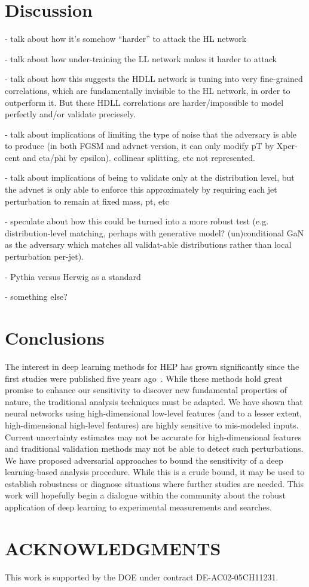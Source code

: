 \documentclass[reprint,nofootinbib,...]{revtex4-1}
\begin{document}
\section{Discussion}
\label{sec:discussion}



- talk about how it's somehow ``harder'' to attack the HL network

- talk about how under-training the LL network makes it harder to attack

- talk about how this suggests the HDLL network is tuning into very fine-grained correlations, which are fundamentally invisible to the HL network, in order to outperform it. But these HDLL correlations are harder/impossible to model perfectly and/or validate preciesely.

- talk about implications of limiting the type of noise that the adversary is able to produce (in both FGSM and advnet version, it can only modify pT by Xper-cent and eta/phi by epsilon). collinear splitting, etc not represented.

- talk about implications of being to validate only at the distribution level, but the advnet is only able to enforce this approximately by requiring each jet perturbation to remain at fixed mass, pt, etc

- speculate about how this could be turned into a more robust test (e.g. distribution-level matching, perhaps with generative model? (un)conditional GaN as the adversary which matches all validat-able distributions rather than local perturbation per-jet).

- Pythia versus Herwig as a standard

- something else?

\clearpage

\section{Conclusions}

The interest in deep learning methods for HEP has grown significantly since the first studies were published five years ago~\cite{Baldi:2014kfa}.  While these methods hold great promise to enhance our sensitivity to discover new fundamental properties of nature, the traditional analysis techniques must be adapted.  We have shown that neural networks using high-dimensional low-level features (and to a lesser extent, high-dimensional high-level features) are highly sensitive to mis-modeled inputs.  Current uncertainty estimates may not be accurate for high-dimensional features and traditional validation methods may not be able to detect such perturbations.  We have proposed adversarial approaches to bound the sensitivity of a deep learning-based analysis procedure.  While this is a crude bound, it may be used to establish robustness or diagnose situations where further studies are needed.  This work will hopefully begin a dialogue within the community about the robust application of deep learning to experimental measurements and searches.

\section*{ACKNOWLEDGMENTS}

This work is supported by the DOE under contract DE-AC02-05CH11231. 


\end{document}
